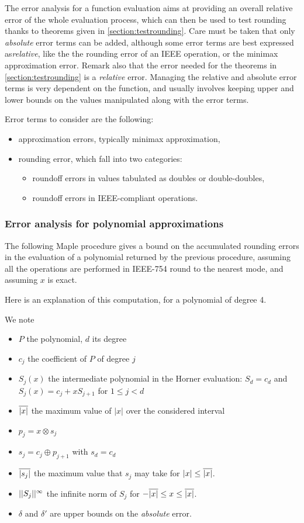 The error analysis for a function evaluation aims at providing an
overall relative error of the whole evaluation process, which can then
be used to test rounding thanks to theorems given in
\ref{section:testrounding}. Care must be taken that only
\emph{absolute} error terms can be added, although some error terms
are best expressed as\emph{relative}, like the the rounding error of
an IEEE operation, or the minimax approximation error. Remark also
that the error needed for the theorems in \ref{section:testrounding}
is a \emph{relative} error. Managing the relative and absolute error
terms is very dependent on the function, and usually involves keeping
upper and lower bounds on the values manipulated along with the error terms.

Error terms to consider are the following:
\begin{itemize}
\item approximation errors, typically minimax approximation,
\item rounding error, which fall into two categories:
  \begin{itemize}
  \item roundoff errors in  values tabulated as doubles or double-doubles,
  \item roundoff errors in IEEE-compliant operations.
  \end{itemize}
\end{itemize}





\subsubsection{Error analysis for polynomial approximations}


The following Maple procedure gives a bound on the accumulated
rounding errors in the evaluation of a polynomial returned by the
previous procedure, assuming all the operations are performed in
IEEE-754 round to the nearest mode, and assuming $x$ is exact.

Here is an explanation of this computation, for a polynomial of degree 4.


 We note 
\begin{itemize}
\item $P$ the polynomial, $d$ its degree
\item $c_j$ the coefficient of $P$ of degree $j$
\item $S_j(x)$ the intermediate polynomial in the Horner evaluation:
  $S_d=c_d$ and $S_j(x) = c_j+xS_{j+1}$ for $1\le j <d$
\item ${\overline{|x|}}$ the maximum value of $|x|$ over the considered interval
\item $p_j = x \otimes s_j $ 
\item $s_j =   c_j \oplus p_{j+1}$ with $s_d = c_d$ 
\item $\overline{|s_{j}|}$ the  maximum value that $s_j$ may take for $|x|
  \le {\overline{|x|}}$.
\item $||{S_j}||^{\infty}$ the infinite norm of $S_j$ for $-{\overline{|x|}} \le
  x\le {\overline{|x|}}$.
\item $\delta$ and $\delta'$ are upper bounds on the \emph{absolute} error.
\end{itemize}

